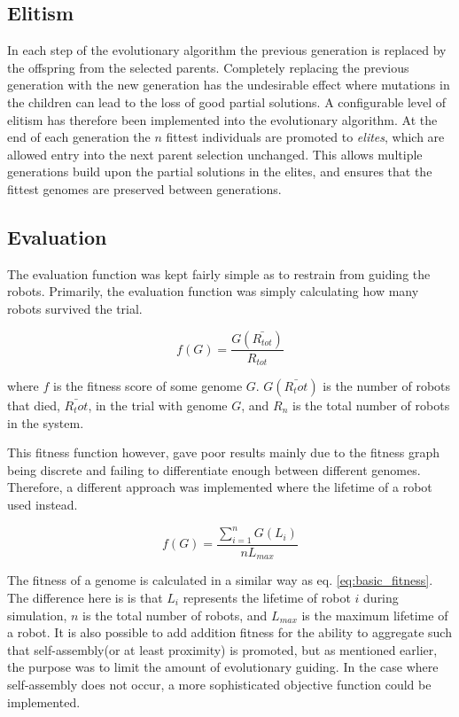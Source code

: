 \subsection{Elitism}
In each step of the evolutionary algorithm the previous generation is replaced by the offspring from the selected parents.
Completely replacing the previous generation with the new generation has the undesirable effect where mutations in the children can lead to the loss of good partial solutions.
A configurable level of elitism has therefore been implemented into the evolutionary algorithm.
At the end of each generation the $n$ fittest individuals are promoted to \emph{elites}, which are allowed entry into the next parent selection unchanged.
This allows multiple generations build upon the partial solutions in the elites, and ensures that the fittest genomes are preserved between generations.

\subsection{Evaluation}
\label{sec:evaluation}
The evaluation function was kept fairly simple as to restrain from guiding the robots.
Primarily, the evaluation function was simply calculating how many robots survived the trial.

\begin{equation}
	\label{eq:basic_fitness}
	f(G) = \frac{G(\bar{R_{tot}})}{R_{tot}}
\end{equation}

where $f$ is the fitness score of some genome $G$.
$G(\bar{R_tot})$ is the number of robots that died, $\bar{R_tot}$, in the trial with genome $G$, and $R_n$ is the total number of robots in the system.

This fitness function however, gave poor results mainly due to the fitness graph being discrete and failing to differentiate enough between different genomes.
Therefore, a different approach was implemented where the lifetime of a robot used instead.

\begin{equation}
	f(G) = \frac{\sum_{i=1}^n G(L_i)}{nL_{max}}
\end{equation}

The fitness of a genome is calculated in a similar way as eq. \ref{eq:basic_fitness}.
The difference here is is that $L_i$ represents the lifetime of robot $i$ during simulation, $n$ is the total number of robots, and $L_{max}$ is the maximum lifetime of a robot.
It is also possible to add addition fitness for the ability to aggregate such that self-assembly(or at least proximity) is promoted, but as mentioned earlier, the purpose was to limit the amount of evolutionary guiding.
In the case where self-assembly does not occur, a more sophisticated objective function could be implemented.
		
